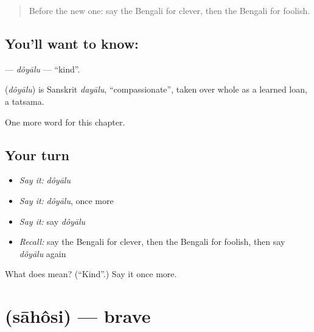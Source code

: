 \label{lesson:BN-C138-doyalu}



\begin{quote}
Before the new one: say the Bengali for clever, then the Bengali for foolish.
\end{quote}

\subsection*{You'll want to know: }
\textbf{} — \emph{dôyālu} — \textquotedblleft{}kind\textquotedblright{}.

\begin{cousinweb}
\textbf{} (\emph{dôyālu}) is Sanskrit \emph{dayālu}, \textquotedblleft{}compassionate\textquotedblright{}, taken over whole as a learned loan, a tatsama.
\end{cousinweb}

\begin{grammarlens}[title={What you've built}]
One more word for this chapter.
\end{grammarlens}

\subsection*{Your turn}
\begin{itemize}
\raggedright
  \item \emph{Say it:} \emph{dôyālu}
  \item \emph{Say it:} \emph{dôyālu}, once more
  \item \emph{Say it:} say \emph{dôyālu}
  \item \emph{Recall:} say the Bengali for clever, then the Bengali for foolish, then say \emph{dôyālu} again
\end{itemize}

\begin{tcolorbox}[breakable,colback=teal!4,colframe=teal!35!black,title={Before you move on}]
What does  mean? (\textquotedblleft{}Kind\textquotedblright{}.) Say it once more.
\end{tcolorbox}
\section[\texorpdfstring{\bn{সাহসী} (sāhôsi)}{সাহসী (sāhôsi)}]{ (sāhôsi) — brave}

\label{lesson:BN-C138-sahosi}




